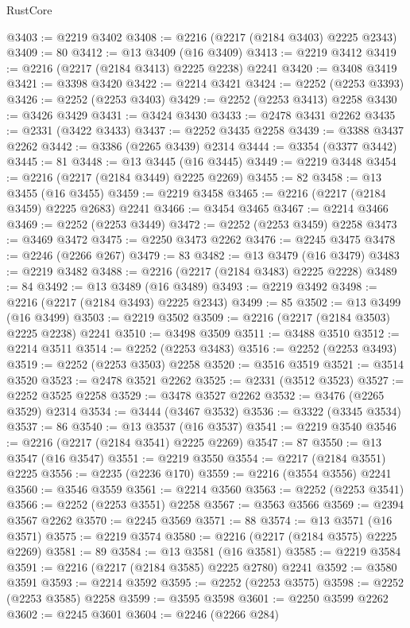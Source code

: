 \begin{lexlean}{RustCore}
\begin{coremodule}
@3403 := @2219 @3402
@3408 := @2216 (@2217 (@2184 @3403) @2225 @2343)
@3409 := 80
@3412 := @13 @3409 (@16 @3409)
@3413 := @2219 @3412
@3419 := @2216 (@2217 (@2184 @3413) @2225 @2238) @2241
@3420 := @3408 @3419
@3421 := @3398 @3420
@3422 := @2214 @3421
@3424 := @2252 (@2253 @3393)
@3426 := @2252 (@2253 @3403)
@3429 := @2252 (@2253 @3413) @2258
@3430 := @3426 @3429
@3431 := @3424 @3430
@3433 := @2478 @3431 @2262
@3435 := @2331 (@3422 @3433)
@3437 := @2252 @3435 @2258
@3439 := @3388 @3437 @2262
@3442 := @3386 (@2265 @3439) @2314
@3444 := @3354 (@3377 @3442)
@3445 := 81
@3448 := @13 @3445 (@16 @3445)
@3449 := @2219 @3448
@3454 := @2216 (@2217 (@2184 @3449) @2225 @2269)
@3455 := 82
@3458 := @13 @3455 (@16 @3455)
@3459 := @2219 @3458
@3465 := @2216 (@2217 (@2184 @3459) @2225 @2683) @2241
@3466 := @3454 @3465
@3467 := @2214 @3466
@3469 := @2252 (@2253 @3449)
@3472 := @2252 (@2253 @3459) @2258
@3473 := @3469 @3472
@3475 := @2250 @3473 @2262
@3476 := @2245 @3475
@3478 := @2246 (@2266 @267)
@3479 := 83
@3482 := @13 @3479 (@16 @3479)
@3483 := @2219 @3482
@3488 := @2216 (@2217 (@2184 @3483) @2225 @2228)
@3489 := 84
@3492 := @13 @3489 (@16 @3489)
@3493 := @2219 @3492
@3498 := @2216 (@2217 (@2184 @3493) @2225 @2343)
@3499 := 85
@3502 := @13 @3499 (@16 @3499)
@3503 := @2219 @3502
@3509 := @2216 (@2217 (@2184 @3503) @2225 @2238) @2241
@3510 := @3498 @3509
@3511 := @3488 @3510
@3512 := @2214 @3511
@3514 := @2252 (@2253 @3483)
@3516 := @2252 (@2253 @3493)
@3519 := @2252 (@2253 @3503) @2258
@3520 := @3516 @3519
@3521 := @3514 @3520
@3523 := @2478 @3521 @2262
@3525 := @2331 (@3512 @3523)
@3527 := @2252 @3525 @2258
@3529 := @3478 @3527 @2262
@3532 := @3476 (@2265 @3529) @2314
@3534 := @3444 (@3467 @3532)
@3536 := @3322 (@3345 @3534)
@3537 := 86
@3540 := @13 @3537 (@16 @3537)
@3541 := @2219 @3540
@3546 := @2216 (@2217 (@2184 @3541) @2225 @2269)
@3547 := 87
@3550 := @13 @3547 (@16 @3547)
@3551 := @2219 @3550
@3554 := @2217 (@2184 @3551) @2225
@3556 := @2235 (@2236 @170)
@3559 := @2216 (@3554 @3556) @2241
@3560 := @3546 @3559
@3561 := @2214 @3560
@3563 := @2252 (@2253 @3541)
@3566 := @2252 (@2253 @3551) @2258
@3567 := @3563 @3566
@3569 := @2394 @3567 @2262
@3570 := @2245 @3569
@3571 := 88
@3574 := @13 @3571 (@16 @3571)
@3575 := @2219 @3574
@3580 := @2216 (@2217 (@2184 @3575) @2225 @2269)
@3581 := 89
@3584 := @13 @3581 (@16 @3581)
@3585 := @2219 @3584
@3591 := @2216 (@2217 (@2184 @3585) @2225 @2780) @2241
@3592 := @3580 @3591
@3593 := @2214 @3592
@3595 := @2252 (@2253 @3575)
@3598 := @2252 (@2253 @3585) @2258
@3599 := @3595 @3598
@3601 := @2250 @3599 @2262
@3602 := @2245 @3601
@3604 := @2246 (@2266 @284)

\end{coremodule}
\end{lexlean}
